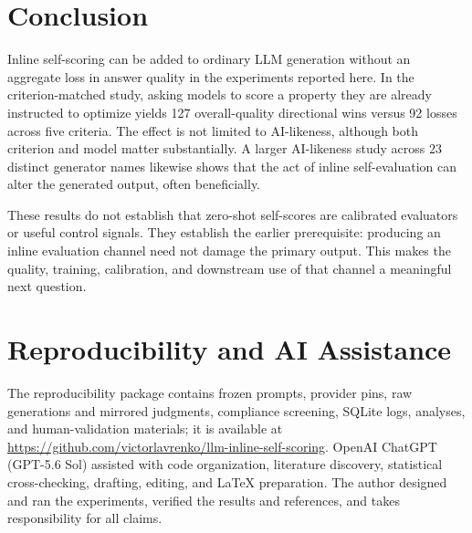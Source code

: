 \documentclass[11pt]{article}
\begin{document}
\section{Conclusion}

Inline self-scoring can be added to ordinary LLM generation without an aggregate loss in answer quality in the experiments reported here. In the criterion-matched study, asking models to score a property they are already instructed to optimize yields 127 overall-quality directional wins versus 92 losses across five criteria. The effect is not limited to AI-likeness, although both criterion and model matter substantially. A larger AI-likeness study across 23 distinct generator names likewise shows that the act of inline self-evaluation can alter the generated output, often beneficially.

These results do not establish that zero-shot self-scores are calibrated evaluators or useful control signals. They establish the earlier prerequisite: producing an inline evaluation channel need not damage the primary output. This makes the quality, training, calibration, and downstream use of that channel a meaningful next question.

\section*{Reproducibility and AI Assistance}

The reproducibility package contains frozen prompts, provider pins, raw generations and mirrored judgments, compliance screening, SQLite logs, analyses, and human-validation materials; it is available at \url{https://github.com/victorlavrenko/llm-inline-self-scoring}. OpenAI ChatGPT (GPT-5.6 Sol) assisted with code organization, literature discovery, statistical cross-checking, drafting, editing, and LaTeX preparation. The author designed and ran the experiments, verified the results and references, and takes responsibility for all claims.

\clearpage


\end{document}
